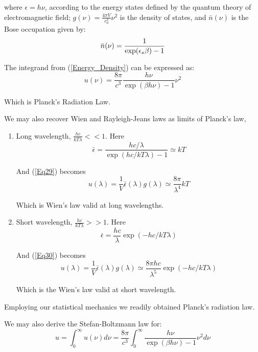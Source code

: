 \documentclass[book.tex]{subfiles}
\begin{document}
\noindent where $\epsilon=h\nu$, according to the energy states defined by the quantum theory of electromagnetic field; $g(\nu)=\frac{4\pi V}{c_0^3}\nu^2$ is the density of states, and $\bar{n}(\nu)$ is the Bose occupation given by:
\begin{equation}
\bar{n}(\nu) = \frac{1}{\exp(\epsilon_{s}\beta)-1} \notag
\end{equation}

The integrand from (\ref{Energy_Density}) can be expressed as:
\begin{equation}\label{Planck}
u(\nu) = \frac{8\pi}{c^{3}}\frac{h\nu}{\exp(\beta h\nu)-1}\nu^{2}
\end{equation}

Which is Planck's Radiation Law. 

We may also recover Wien and Rayleigh-Jeans laws as limits of Planck's law,
\begin{enumerate}
\item Long wavelength, $\frac{hc}{kT\lambda} << 1$. Here
\begin{equation}\label{Eq29}
\bar{\epsilon}= \frac{hc/\lambda}{\exp(hc/kT\lambda)-1} \simeq kT
\end{equation}

And (\ref{Eq29}) becomes
\begin{equation}\label{Eq30}
u(\lambda)= \frac{1}{V} \bar{\epsilon}(\lambda) g(\lambda) \simeq \frac{8 \pi}{\lambda^{4}} kT
\end{equation}

Which is Wien's law valid at long wavelengths.

\item Short wavelength, $\frac{hc}{kT\lambda} >> 1$. Here
\begin{equation}\label{Eq31}
\bar{\epsilon}= \frac{hc}{\lambda} \exp(-hc/kT\lambda)
\end{equation}

And (\ref{Eq30}) becomes
\begin{equation}\label{Eq32}
u(\lambda)= \frac{1}{V} \bar{\epsilon}(\lambda) g(\lambda) \simeq \frac{8 \pi hc}{\lambda^{5}} \exp(-hc/kT\lambda)
\end{equation}

Which is the Wien's law valid at short wavelength. 
\end{enumerate}

Employing our statistical mechanics we readily obtained Planck's radiation law. 

We may also derive the Stefan-Boltzmann law for:
\begin{equation}\label{Eq33}
u = \int_0^{\infty} u(\nu) d\nu = \frac{8\pi}{c^{3}} \int_0^{\infty} \frac{h\nu}{\exp(\beta h\nu)-1}\nu^{2}d\nu
\end{equation}
\end{document}
